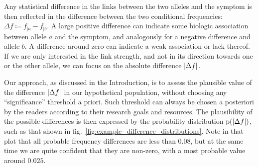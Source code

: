 \documentclass[\ifafour a4paper,12pt,\else a5paper,10pt,\fi%
onecolumn,oneside,article,%
british%
]{memoir}
\theoremstyle{remark}
\theoremstyle{innote}
\newcommand*{\defd}{\coloneqq}
\DeclarePairedDelimiter\abs{\lvert}{\rvert}
\newcommand*{\pf}{\mathrm{p}}%
\renewcommand*{\|}[1][]{\nonscript\,#1\vert\nonscript\;\mathopen{}}
\newcommand*{\fig}{fig.}%
\newcommand*{\ya}{a}
\newcommand*{\yb}{b}
\newcommand*{\df}{\Delta f}
\begin{document}
Any statistical difference in the links between the two alleles and the
symptom is then reflected in the difference between the two conditional
frequencies: $\df \defd f_{|\ya}-f_{|\yb}$. A large positive difference can
indicate some biologic association between allele $\ya$ and the symptom, and
analogously for a negative difference and allele $\yb$. A difference around
zero can indicate a weak association or lack thereof. If we are only interested
in the link strength, and not in its direction towards one or the other
allele, we can focus on the absolute difference $\abs{\df}$.

Our approach, as discussed in the Introduction, is to assess the plausible
value of the difference $\abs{\df}$ in our hypothetical population, without
choosing any \enquote{significance} threshold a priori. Such threshold can
always be chosen a posteriori by the readers according to their research
goals and resources. The plausibility of the possible differences is then
expressed by the probability distribution $\pf(\abs{\df})$, such as that
shown in \fig~\ref{fig:example_difference_distributions}. Note in that plot
that all probable frequency differences are less than $0.08$, but at the
same time we are quite confident that they are non-zero, with a most
probable value around $0.025$.
\end{document}
